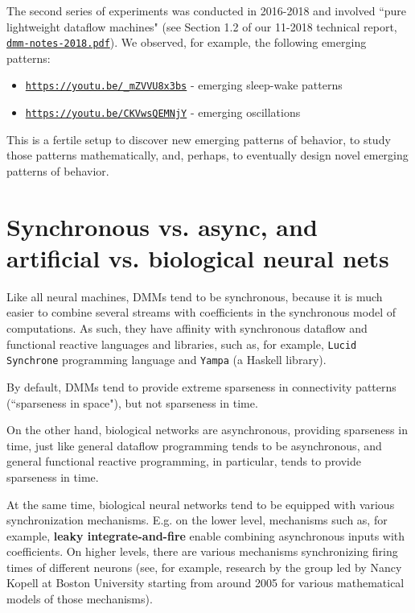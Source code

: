 \documentclass{article}
\begin{document}
The second series of experiments was conducted in 2016-2018 and involved ``pure lightweight dataflow machines" (see Section 1.2 of our 11-2018 technical report, 
\href{https://www.cs.brandeis.edu/~bukatin/dmm-notes-2018.pdf}{\tt dmm-notes-2018.pdf}).
We observed, for example, the following emerging patterns:

\begin{itemize}
   \item \href{https://youtu.be/\_mZVVU8x3bs}{\tt https://youtu.be/\_mZVVU8x3bs} - emerging sleep-wake patterns
   \item \href{https://youtu.be/CKVwsQEMNjY}{\tt https://youtu.be/CKVwsQEMNjY} - emerging oscillations
\end{itemize}

This is a fertile setup to discover new emerging patterns of behavior, to study those patterns mathematically,
and, perhaps, to eventually design novel emerging patterns of behavior.

\section{Synchronous vs. async, and artificial vs. biological neural nets}

Like all neural machines, DMMs tend to be synchronous, because it is much easier to combine
several streams with coefficients in the synchronous model of computations. As such, they have affinity with
synchronous dataflow and functional reactive languages and libraries, such as, for example,
{\tt Lucid Synchrone} programming language and {\tt Yampa} (a Haskell library).

By default, DMMs tend to provide extreme sparseness in connectivity patterns (``sparseness in space"),
but not sparseness in time. 

On the other hand, biological networks are asynchronous, providing sparseness in time, just like
general dataflow programming tends to be asynchronous, and general functional reactive programming,
in particular, tends to provide sparseness in time.

At the same time, biological neural networks tend to be equipped with various synchronization mechanisms.
E.g. on the lower level, mechanisms such as, for example, {\bf leaky integrate-and-fire} enable combining
asynchronous inputs with coefficients. On higher levels, there are various mechanisms synchronizing firing times
of different neurons (see, for example, research by the group led by Nancy Kopell at Boston University starting from
around 2005 for various mathematical models of those mechanisms).
\end{document}
